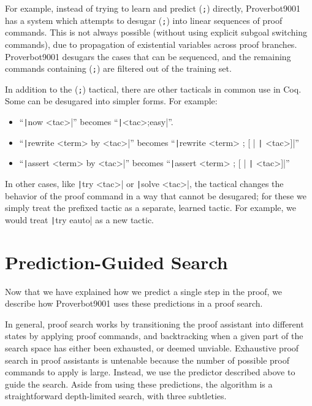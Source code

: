 \documentclass[sigplan,screen]{acmart}
\newcommand{\name}{Proverbot9001\xspace}
\newcommand{\coqinline}[1]{\texttt|#1|}
\renewcommand{\>}{\quad}
\begin{document}
For example, instead of trying to learn and predict (\verb|;|) directly, \name{} has a system which attempts to desugar (\verb-;-) into linear sequences of proof commands.
This is not always possible (without using explicit subgoal switching commands), due to propagation of existential variables across proof branches.
\name{} desugars the cases that can be sequenced, and the remaining commands containing (\verb|;|) are filtered out of the training set.











In addition to the (\verb|;|) tactical,
  there are other tacticals in common use in Coq.
Some can be desugared into simpler forms.
For example:
\begin{itemize}
\item ``\coqinline{now <tac>}'' becomes ``\coqinline{<tac>;easy}''.
\item ``\coqinline{rewrite <term> by <tac>}'' becomes ``\coqinline{rewrite <term> ; [ } \coqinline{ <tac>]}''
\item ``\coqinline{assert <term> by <tac>}'' becomes ``\coqinline{assert <term> ; [ } \coqinline{ <tac>]}''
\end{itemize}

In other cases, like \coqinline{try <tac>} or \coqinline{solve <tac>},
  the tactical changes the behavior of the proof command in a way that cannot be desugared;
  for these we simply treat the prefixed tactic as a separate, learned tactic.
For example, we would treat \coqinline{try eauto} as a new tactic.

\section{Prediction-Guided Search}
\label{sec:search}

Now that we have explained how we predict a single step in the proof, we
describe how \name{} uses these predictions in a proof search.

In general,
proof search works by transitioning the proof assistant into different states by applying proof commands,
and backtracking when a given part of the search space has either been exhausted, or deemed unviable.
Exhaustive proof search in proof assistants is untenable
because the number of possible proof commands to apply is large.
Instead, we use the predictor described above to guide
the search.
Aside from using these predictions, the algorithm is a straightforward depth-limited search, with three subtleties.
\end{document}
